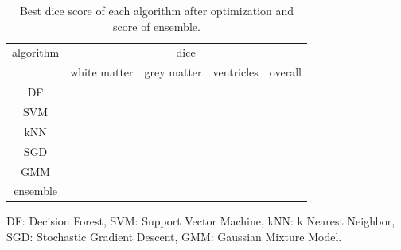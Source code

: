 \documentclass[journal]{IEEEtran}
\begin{document}
\begin{table}[h!]
	\begin{center}
		\label{tab.dice}
		\caption{Best dice score of each algorithm after optimization and score of ensemble.}
		\begin{tabular}{c|ccc|c}
			algorithm &             \multicolumn{4}{c}{dice}              \\ \cline{2-5}
			          & white matter & grey matter & ventricles & overall \\
			   DF     &              &             &            &  \\
			   SVM    &              &             &            &  \\
			   kNN    &              &             &            &  \\
			   SGD    &              &             &            &  \\
			   GMM    &              &             &            &  \\
			ensemble  &              &             &            &
		\end{tabular}
	\end{center}
DF: Decision Forest, SVM: Support Vector Machine, kNN: k Nearest Neighbor, SGD: Stochastic Gradient Descent, GMM: Gaussian Mixture Model.
\end{table} 
\end{document}
